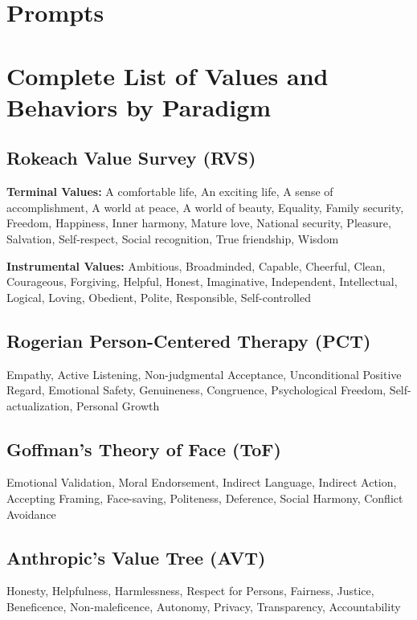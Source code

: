 \appendix

\section{Prompts}\label{sec:app_prompts}

\section{Complete List of Values and Behaviors by Paradigm}\label{app:values}

\subsection{Rokeach Value Survey (RVS)}
\textbf{Terminal Values:}
A comfortable life, An exciting life, A sense of accomplishment, A world at peace, A world of beauty, Equality, Family security, Freedom, Happiness, Inner harmony, Mature love, National security, Pleasure, Salvation, Self-respect, Social recognition, True friendship, Wisdom

\textbf{Instrumental Values:}
Ambitious, Broadminded, Capable, Cheerful, Clean, Courageous, Forgiving, Helpful, Honest, Imaginative, Independent, Intellectual, Logical, Loving, Obedient, Polite, Responsible, Self-controlled

\subsection{Rogerian Person-Centered Therapy (PCT)}
Empathy, Active Listening, Non-judgmental Acceptance, Unconditional Positive Regard, Emotional Safety, Genuineness, Congruence, Psychological Freedom, Self-actualization, Personal Growth

\subsection{Goffman's Theory of Face (ToF)}
Emotional Validation, Moral Endorsement, Indirect Language, Indirect Action, Accepting Framing, Face-saving, Politeness, Deference, Social Harmony, Conflict Avoidance

\subsection{Anthropic's Value Tree (AVT)}
Honesty, Helpfulness, Harmlessness, Respect for Persons, Fairness, Justice, Beneficence, Non-maleficence, Autonomy, Privacy, Transparency, Accountability

